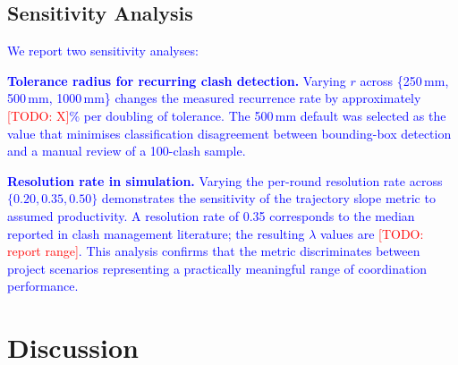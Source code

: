 \documentclass[conference]{IEEEtran}
\newcommand{\todo}[1]{\textcolor{red}{[TODO: #1]}}
\newcommand{\placeholder}[1]{\textcolor{blue}{#1}}
\begin{document}
\subsection{Sensitivity Analysis}
\placeholder{
We report two sensitivity analyses:

\textbf{Tolerance radius for recurring clash detection.} Varying $r$ across \{250\,mm, 500\,mm, 1000\,mm\} changes the measured recurrence rate by approximately \todo{X}\% per doubling of tolerance. The 500\,mm default was selected as the value that minimises classification disagreement between bounding-box detection and a manual review of a 100-clash sample.

\textbf{Resolution rate in simulation.} Varying the per-round resolution rate across $\{0.20, 0.35, 0.50\}$ demonstrates the sensitivity of the trajectory slope metric to assumed productivity. A resolution rate of 0.35 corresponds to the median reported in clash management literature; the resulting $\lambda$ values are \todo{report range}. This analysis confirms that the metric discriminates between project scenarios representing a practically meaningful range of coordination performance.
}

\section{Discussion}
\end{document}
